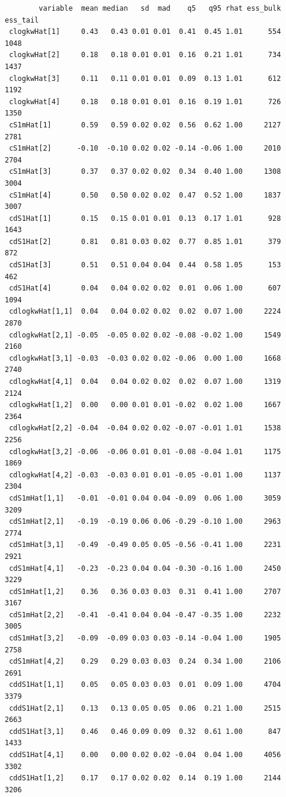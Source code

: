 \documentclass[
]{article}
\begin{document}
\begin{verbatim}
        variable  mean median   sd  mad    q5   q95 rhat ess_bulk ess_tail
 clogkwHat[1]     0.43   0.43 0.01 0.01  0.41  0.45 1.01      554     1048
 clogkwHat[2]     0.18   0.18 0.01 0.01  0.16  0.21 1.01      734     1437
 clogkwHat[3]     0.11   0.11 0.01 0.01  0.09  0.13 1.01      612     1192
 clogkwHat[4]     0.18   0.18 0.01 0.01  0.16  0.19 1.01      726     1350
 cS1mHat[1]       0.59   0.59 0.02 0.02  0.56  0.62 1.00     2127     2781
 cS1mHat[2]      -0.10  -0.10 0.02 0.02 -0.14 -0.06 1.00     2010     2704
 cS1mHat[3]       0.37   0.37 0.02 0.02  0.34  0.40 1.00     1308     3004
 cS1mHat[4]       0.50   0.50 0.02 0.02  0.47  0.52 1.00     1837     3007
 cdS1Hat[1]       0.15   0.15 0.01 0.01  0.13  0.17 1.01      928     1643
 cdS1Hat[2]       0.81   0.81 0.03 0.02  0.77  0.85 1.01      379      872
 cdS1Hat[3]       0.51   0.51 0.04 0.04  0.44  0.58 1.05      153      462
 cdS1Hat[4]       0.04   0.04 0.02 0.02  0.01  0.06 1.00      607     1094
 cdlogkwHat[1,1]  0.04   0.04 0.02 0.02  0.02  0.07 1.00     2224     2870
 cdlogkwHat[2,1] -0.05  -0.05 0.02 0.02 -0.08 -0.02 1.00     1549     2160
 cdlogkwHat[3,1] -0.03  -0.03 0.02 0.02 -0.06  0.00 1.00     1668     2740
 cdlogkwHat[4,1]  0.04   0.04 0.02 0.02  0.02  0.07 1.00     1319     2124
 cdlogkwHat[1,2]  0.00   0.00 0.01 0.01 -0.02  0.02 1.00     1667     2364
 cdlogkwHat[2,2] -0.04  -0.04 0.02 0.02 -0.07 -0.01 1.01     1538     2256
 cdlogkwHat[3,2] -0.06  -0.06 0.01 0.01 -0.08 -0.04 1.01     1175     1869
 cdlogkwHat[4,2] -0.03  -0.03 0.01 0.01 -0.05 -0.01 1.00     1137     2304
 cdS1mHat[1,1]   -0.01  -0.01 0.04 0.04 -0.09  0.06 1.00     3059     3209
 cdS1mHat[2,1]   -0.19  -0.19 0.06 0.06 -0.29 -0.10 1.00     2963     2774
 cdS1mHat[3,1]   -0.49  -0.49 0.05 0.05 -0.56 -0.41 1.00     2231     2921
 cdS1mHat[4,1]   -0.23  -0.23 0.04 0.04 -0.30 -0.16 1.00     2450     3229
 cdS1mHat[1,2]    0.36   0.36 0.03 0.03  0.31  0.41 1.00     2707     3167
 cdS1mHat[2,2]   -0.41  -0.41 0.04 0.04 -0.47 -0.35 1.00     2232     3005
 cdS1mHat[3,2]   -0.09  -0.09 0.03 0.03 -0.14 -0.04 1.00     1905     2758
 cdS1mHat[4,2]    0.29   0.29 0.03 0.03  0.24  0.34 1.00     2106     2691
 cddS1Hat[1,1]    0.05   0.05 0.03 0.03  0.01  0.09 1.00     4704     3379
 cddS1Hat[2,1]    0.13   0.13 0.05 0.05  0.06  0.21 1.00     2515     2663
 cddS1Hat[3,1]    0.46   0.46 0.09 0.09  0.32  0.61 1.00      847     1433
 cddS1Hat[4,1]    0.00   0.00 0.02 0.02 -0.04  0.04 1.00     4056     3302
 cddS1Hat[1,2]    0.17   0.17 0.02 0.02  0.14  0.19 1.00     2144     3206

\end{verbatim}
\end{document}

